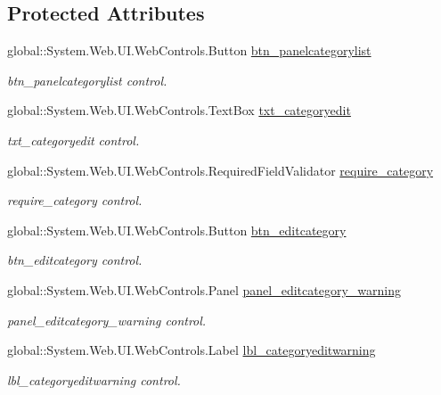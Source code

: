 \subsection*{Protected Attributes}
\begin{DoxyCompactItemize}
\item 
global\+::\+System.\+Web.\+U\+I.\+Web\+Controls.\+Button \mbox{\hyperlink{class_admin__edit_category_a2aa6d0590ac829f5c63575a7a28551db}{btn\+\_\+panelcategorylist}}
\begin{DoxyCompactList}\small\item\em btn\+\_\+panelcategorylist control. \end{DoxyCompactList}\item 
global\+::\+System.\+Web.\+U\+I.\+Web\+Controls.\+Text\+Box \mbox{\hyperlink{class_admin__edit_category_a2cf7a22b501c62d6a8cd307cd34bbcd4}{txt\+\_\+categoryedit}}
\begin{DoxyCompactList}\small\item\em txt\+\_\+categoryedit control. \end{DoxyCompactList}\item 
global\+::\+System.\+Web.\+U\+I.\+Web\+Controls.\+Required\+Field\+Validator \mbox{\hyperlink{class_admin__edit_category_ab8ffa57812449a95e551d52671c5dc6a}{require\+\_\+category}}
\begin{DoxyCompactList}\small\item\em require\+\_\+category control. \end{DoxyCompactList}\item 
global\+::\+System.\+Web.\+U\+I.\+Web\+Controls.\+Button \mbox{\hyperlink{class_admin__edit_category_a4f54c465076017e1d5ccdce8babbc9c8}{btn\+\_\+editcategory}}
\begin{DoxyCompactList}\small\item\em btn\+\_\+editcategory control. \end{DoxyCompactList}\item 
global\+::\+System.\+Web.\+U\+I.\+Web\+Controls.\+Panel \mbox{\hyperlink{class_admin__edit_category_a9775171591e270ecb04dfba0e76f928e}{panel\+\_\+editcategory\+\_\+warning}}
\begin{DoxyCompactList}\small\item\em panel\+\_\+editcategory\+\_\+warning control. \end{DoxyCompactList}\item 
global\+::\+System.\+Web.\+U\+I.\+Web\+Controls.\+Label \mbox{\hyperlink{class_admin__edit_category_a36a78751c26371baf48b0621cc7caab7}{lbl\+\_\+categoryeditwarning}}
\begin{DoxyCompactList}\small\item\em lbl\+\_\+categoryeditwarning control. \end{DoxyCompactList}\end{DoxyCompactItemize}



